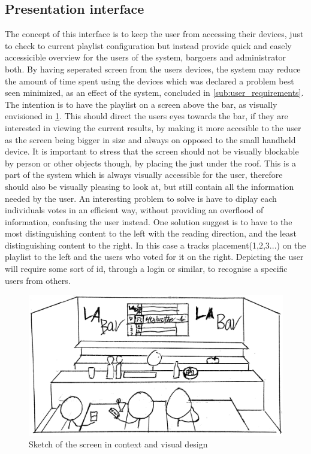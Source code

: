 \subsection{Presentation interface}

The concept of this interface is to keep the user from accessing their devices, just to check to current playlist configuration but instead provide quick and easely accessicible overview for the users of the system, bargoers and administrator both. By having seperated screen from the users devices, the system may reduce the amount of time spent using the devices which was declared a problem best seen minimized, as an effect of the system, concluded in \cref{sub:user_requirements}. The intention is to have the playlist on a screen above the bar, as visually envisioned in \cref{fig:PresentationInterface}. This should direct the users eyes towards the bar, if they are interested in viewing the current results, by making it more accesible to the user as the screen being bigger in size and always on opposed to the small handheld device\cite{DEB}. It is important to stress that the screen should not be visually blockable by person or other objects though, by placing the just under the roof. 
This is a part of the system which is always visually accessible for the user, therefore should also be visually pleasing to look at, but still contain all the information needed by the user. An interesting problem to solve is have to diplay each individuals votes in an efficient way, without providing an overflood of information, confusing the user instead. One solution suggest is to have to the most distinguishing content to the left with the reading direction, and the least distinguishing content to the right\cite{material}. In this case a tracks placement(1,2,3...) on the playlist to the left and the users who voted for it on the right. Depicting the user will require some sort of id, through a login or similar, to recognise a specific users from others.

\begin{figure}[H]
  \centering
  \includegraphics[width=1.0\linewidth]{Images/presentation.png}
  \caption{Sketch of the screen in context and visual design}\label{fig:PresentationInterface}
\end{figure}